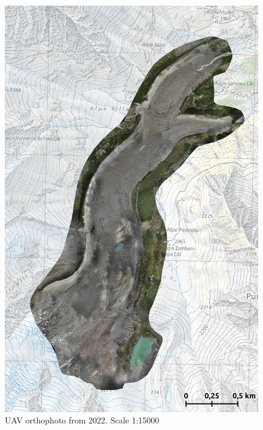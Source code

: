 \begin{figure}[p]
    \centering
    \includegraphics[width=\textwidth]{figures/appendix/orto_2022.jpg}
    \caption{UAV orthophoto from 2022. Scale 1:15000}
\end{figure}

